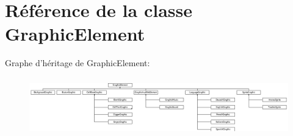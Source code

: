 \hypertarget{class_graphic_element}{\section{Référence de la classe Graphic\-Element}
\label{class_graphic_element}
}
Graphe d'héritage de Graphic\-Element\-:\begin{figure}[H]
\begin{center}
\leavevmode
\includegraphics[height=2.578947cm]{class_graphic_element}
\end{center}
\end{figure}
